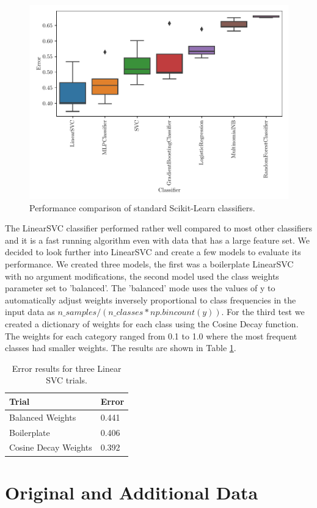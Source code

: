 \begin{figure}[ht]
  \centering
  \includegraphics[width=\textwidth]{../img/plot_explore_classifiers.pdf}
  \caption{Performance comparison of standard Scikit-Learn classifiers.}
  \label{fig:explore_classifiers}
\end{figure}

The LinearSVC classifier performed rather well compared to most other classifiers and it is a fast running algorithm even with data that has a large feature set. We decided to look further into LinearSVC and create a few models to evaluate its performance. We created three models, the first was a boilerplate LinearSVC with no argument modifications, the second model used the class weights parameter set to 'balanced'. The 'balanced' mode uses the values of y to automatically adjust weights inversely proportional to class frequencies in the input data as $n\_samples / (n\_classes * np.bincount(y))$. For the third test we created a dictionary of weights for each class using the Cosine Decay function. The weights for each category ranged from 0.1 to 1.0 where the most frequent classes had smaller weights. The results are shown in Table \ref{tab:lsvc_models}.


\begin{table}[h]
\centering
\begin{tabular}{|l|l|}
\hline
\textbf{Trial} & \textbf{Error} \\
\hline
Balanced Weights & 0.441 \\
\hline
Boilerplate & 0.406 \\
\hline
Cosine Decay Weights & 0.392 \\
\hline
\end{tabular}
\caption{Error results for three Linear SVC trials.}
\label{tab:lsvc_models}
\end{table}


\section{Original and Additional Data}